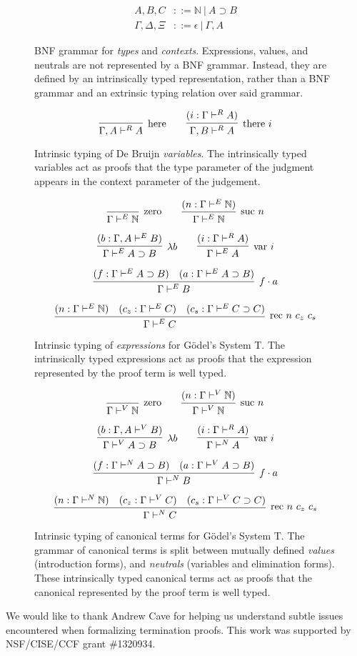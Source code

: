 \documentclass[preprint,nonatbib]{sigplanconf}
\def\arr{\supset}
\def\app{\cdot}
\def\lam{\lambda}
\def\nat{\mathbb{N}}
\newcommand{\con}[1]{\textmd{#1}}
\newcommand{\fun}[1]{\textmd{#1}}
\newcommand{\type}[1]{\Gamma \vdash^E #1}
\newcommand{\ctype}[2]{\Gamma , #1 \vdash^E #2}
\newcommand{\typv}[1]{\Gamma \vdash^V #1}
\newcommand{\ctypv}[2]{\Gamma , #1 \vdash^V #2}
\newcommand{\typn}[1]{\Gamma \vdash^N #1}
\newcommand{\typr}[1]{\Gamma \vdash^R #1}
\newcommand{\ctypr}[2]{\Gamma , #1 \vdash^R #2}
\begin{document}

\begin{figure}
\caption{
BNF grammar for {\it types} and {\it contexts}. 
Expressions, values, and neutrals
are not represented by a BNF grammar. Instead, they are defined by
an intrinsically typed representation, rather than a BNF grammar and
an extrinsic typing relation over said grammar.
}
\begin{align*}
A, B, C &::= \nat ~ | ~ A \arr B \\
\Gamma, \Delta, \Xi &::= \epsilon ~ | ~ \Gamma , A
\end{align*}
\label{fig:gram}
\end{figure}

\begin{figure}
\caption{
Intrinsic typing of De Bruijn {\it variables}.
The intrinsically typed variables act as proofs that the type
parameter of the judgment appears in the context parameter of the
judgement.
}
$$
\infer
  [\con{here}]
  {\ctypr{A}{A}}
{
}
\qquad
\infer
  [\con{there} ~ i]
  {\ctypr{B}{A}}
{
  (i : \typr{A})
}
$$
\label{fig:typr}
\end{figure}

\begin{figure}
\caption{
Intrinsic typing of {\it expressions} for G{\"o}del's System T. The
intrinsically typed expressions act as proofs that the expression
represented by the proof term is well typed.
}
$$
\infer
  [\con{zero}]
  {\type{\nat}}
{}
\qquad
\infer
  [\con{suc} ~ n]
  {\type{\nat}}
{
  (n : \type{\nat})
}
$$

$$
\infer
  [\lam b]
  {\type{A \arr B}}
{
  (b : \ctype{A}{B})
}
\qquad
\infer
  [\fun{var} ~ i]
  {\type{A}}
{
  (i : \typr{A})
}
$$

$$
\infer
  [f \app a]
  {\type{B}}
{
  (f : \type{A \arr B})
  &
  (a : \type{A \arr B})
}
$$

$$
\infer
  [\fun{rec} ~ n ~ c_z ~ c_s]
  {\type{C}}
{
  (n : \type{\nat})
  &
  (c_z : \type{C})
  &
  (c_s : \type{C \arr C})
}
$$
\label{fig:type}
\end{figure}

\begin{figure}
\caption{
Intrinsic typing of canonical terms for G{\"o}del's System T. The
grammar of canonical terms is split between mutually defined
{\it values} (introduction forms),
and {\it neutrals} (variables and elimination forms).
These intrinsically typed canonical terms act as proofs that the
canonical represented by the proof term is well typed.
}
$$
\infer
  [\con{zero}]
  {\typv{\nat}}
{}
\qquad
\infer
  [\con{suc} ~ n]
  {\typv{\nat}}
{
  (n : \typv{\nat})
}
$$

$$
\infer
  [\lam b]
  {\typv{A \arr B}}
{
  (b : \ctypv{A}{B})
}
\qquad
\infer
  [\fun{var} ~ i]
  {\typn{A}}
{
  (i : \typr{A})
}
$$

$$
\infer
  [f \app a]
  {\typn{B}}
{
  (f : \typn{A \arr B})
  &
  (a : \typv{A \arr B})
}
$$

$$
\infer
  [\fun{rec} ~ n ~ c_z ~ c_s]
  {\typn{C}}
{
  (n : \typn{\nat})
  &
  (c_z : \typv{C})
  &
  (c_s : \typv{C \arr C})
}
$$
\label{fig:typv}
\end{figure}


\acks

We would like to thank Andrew Cave for helping us understand subtle
issues encountered when formalizing termination proofs.
This work was supported by NSF/CISE/CCF grant \#1320934.



\end{document}

